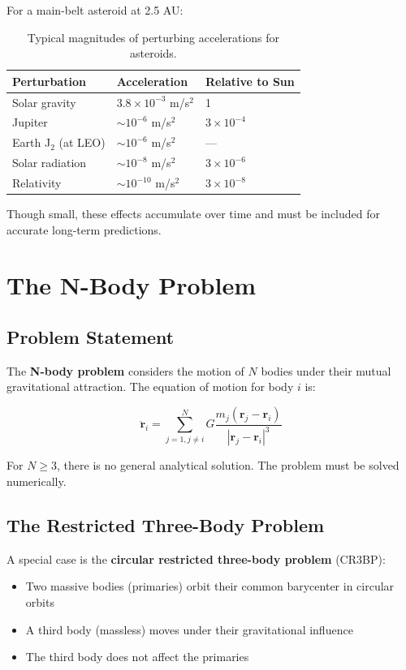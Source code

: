 For a main-belt asteroid at 2.5 AU:

\begin{table}[htbp]
\centering
\begin{tabular}{@{}l p{3.3cm} p{3.3cm}@{}}
\toprule
\textbf{Perturbation} & \textbf{Acceleration} & \textbf{Relative to Sun} \\
\midrule
Solar gravity & $3.8 \times 10^{-3}$ m/s$^2$ & 1 \\
Jupiter & $\sim 10^{-6}$ m/s$^2$ & $3 \times 10^{-4}$ \\
Earth J$_2$ (at LEO) & $\sim 10^{-6}$ m/s$^2$ & — \\
Solar radiation & $\sim 10^{-8}$ m/s$^2$ & $3 \times 10^{-6}$ \\
Relativity & $\sim 10^{-10}$ m/s$^2$ & $3 \times 10^{-8}$ \\
\bottomrule
\end{tabular}
\caption{Typical magnitudes of perturbing accelerations for asteroids.}
\label{tab:pert_magnitudes}
\end{table}

Though small, these effects accumulate over time and must be included for accurate long-term predictions.

\section{The N-Body Problem}

\subsection{Problem Statement}

The \textbf{N-body problem} considers the motion of $N$ bodies under their mutual gravitational attraction. The equation of motion for body $i$ is:

\begin{equation}
    \ddot{\mathbf{r}}_i = \sum_{j=1, j \neq i}^{N} G\frac{m_j(\mathbf{r}_j - \mathbf{r}_i)}{|\mathbf{r}_j - \mathbf{r}_i|^3}
\end{equation}

For $N \geq 3$, there is no general analytical solution. The problem must be solved numerically.

\subsection{The Restricted Three-Body Problem}

A special case is the \textbf{circular restricted three-body problem} (CR3BP):
\begin{itemize}
    \item Two massive bodies (primaries) orbit their common barycenter in circular orbits
    \item A third body (massless) moves under their gravitational influence
    \item The third body does not affect the primaries
\end{itemize}

